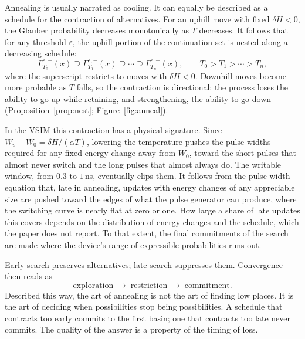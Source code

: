 \documentclass[11pt]{article}
\theoremstyle{definition}
\theoremstyle{remark}
\begin{document}
Annealing is usually narrated as cooling. It can equally be described as a schedule for the contraction of alternatives. For an uphill move with fixed $\delta H < 0$, the Glauber probability decreases monotonically as $T$ decreases. It follows that for any threshold $\varepsilon$, the uphill portion of the continuation set is nested along a decreasing schedule:
\begin{equation}
\Gamma_{T_0}^{\varepsilon,-}(x) \supseteq \Gamma_{T_1}^{\varepsilon,-}(x) \supseteq \cdots \supseteq \Gamma_{T_n}^{\varepsilon,-}(x), \qquad T_0 > T_1 > \cdots > T_n,
\end{equation}
where the superscript restricts to moves with $\delta H < 0$. Downhill moves become more probable as $T$ falls, so the contraction is directional: the process loses the ability to go up while retaining, and strengthening, the ability to go down (Proposition~\ref{prop:nest}; Figure~\ref{fig:anneal}).

In the VSIM this contraction has a physical signature. Since $W_v - W_0 = \delta H / (\alpha T)$, lowering the temperature pushes the pulse widths required for any fixed energy change away from $W_0$, toward the short pulses that almost never switch and the long pulses that almost always do. The writable window, from $0.3$ to $1$\,ns, eventually clips them. It follows from the pulse-width equation that, late in annealing, updates with energy changes of any appreciable size are pushed toward the edges of what the pulse generator can produce, where the switching curve is nearly flat at zero or one. How large a share of late updates this covers depends on the distribution of energy changes and the schedule, which the paper does not report. To that extent, the final commitments of the search are made where the device's range of expressible probabilities runs out.

Early search preserves alternatives; late search suppresses them. Convergence then reads as
\begin{equation}
\text{exploration} \;\longrightarrow\; \text{restriction} \;\longrightarrow\; \text{commitment}.
\end{equation}
Described this way, the art of annealing is not the art of finding low places. It is the art of deciding when possibilities stop being possibilities. A schedule that contracts too early commits to the first basin; one that contracts too late never commits. The quality of the answer is a property of the timing of loss.
\end{document}
